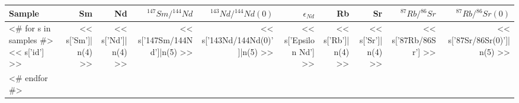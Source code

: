 \begin{tabular}{l r r r r r r r r r}
\hline
 Sample & Sm & Nd &
  ${^{147}Sm}/{^{144}Nd}$ &
  ${^{143}Nd}/{^{144}Nd}(0)$ &
  $\epsilon_{Nd}$ & Rb & Sr &
  ${^{87}Rb}/{^{86}Sr}$ &
  ${^{87}Rb}/{^{86}Sr}(0)$ \\
\hline
<# for s in samples  #>
  << s['id'] >> &
  << s['Sm']| n(4) >> &
  << s['Nd']|n(4) >> &
  << s['147Sm/144Nd']|n(5) >> &
  << s['143Nd/144Nd(0)']|n(5) >> &
  << s['Epsilon Nd'] >> &
  << s['Rb']|n(4) >> &
  << s['Sr']|n(4) >> &
  << s['87Rb/86Sr'] >> &
  << s['87Sr/86Sr(0)']|n(5) >> \\
<# endfor  #>

\hline
\end{tabular}

